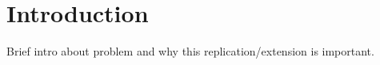 
\section{Introduction}
\label{sec:introduction}

Brief intro about problem and why this replication/extension is important.

